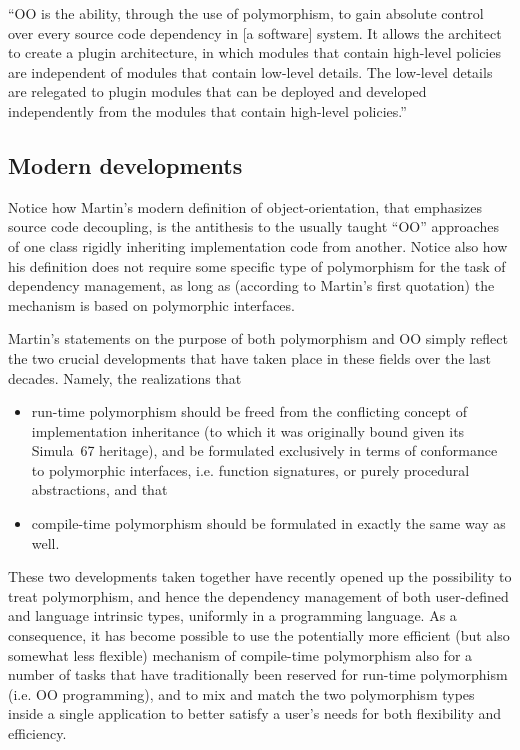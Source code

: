 \documentclass[11pt,oneside]{article}
\begin{document}
\begin{displayquote}
  ``OO is the ability, through the use of polymorphism, to gain
  absolute control over every source code dependency in [a software]
  system. It allows the architect to create a plugin architecture, in
  which modules that contain high-level policies are independent of
  modules that contain low-level details. The low-level details are
  relegated to plugin modules that can be deployed and developed
  independently from the modules that contain high-level policies.''
\end{displayquote}

\subsection{Modern developments}

Notice how Martin's modern definition of object-orientation, that
emphasizes source code decoupling, is the antithesis to the usually
taught ``OO'' approaches of one class rigidly inheriting
implementation code from another. Notice also how his definition does
not require some specific type of polymorphism for the task of
dependency management, as long as (according to Martin's first
quotation) the mechanism is based on polymorphic interfaces.

Martin's statements on the purpose of both polymorphism and OO simply
reflect the two crucial developments that have taken place in these
fields over the last decades. Namely, the realizations that
\begin{itemize}
\item
  run-time polymorphism should be freed from the conflicting concept
  of implementation inheritance (to which it was originally bound
  given its Simula~67 heritage), and be formulated exclusively in
  terms of conformance to polymorphic interfaces, i.e. function
  signatures, or purely procedural abstractions, and that
\item
  compile-time polymorphism should be formulated in exactly the same
  way as well.
\end{itemize}

These two developments taken together have recently opened up the
possibility to treat polymorphism, and hence the dependency management
of both user-defined and language intrinsic types, uniformly in a
programming language. As a consequence, it has become possible to use
the potentially more efficient (but also somewhat less flexible)
mechanism of compile-time polymorphism also for a number of tasks that
have traditionally been reserved for run-time polymorphism (i.e. OO
programming), and to mix and match the two polymorphism types inside a
single application to better satisfy a user's needs for both
flexibility and efficiency.
\end{document}
